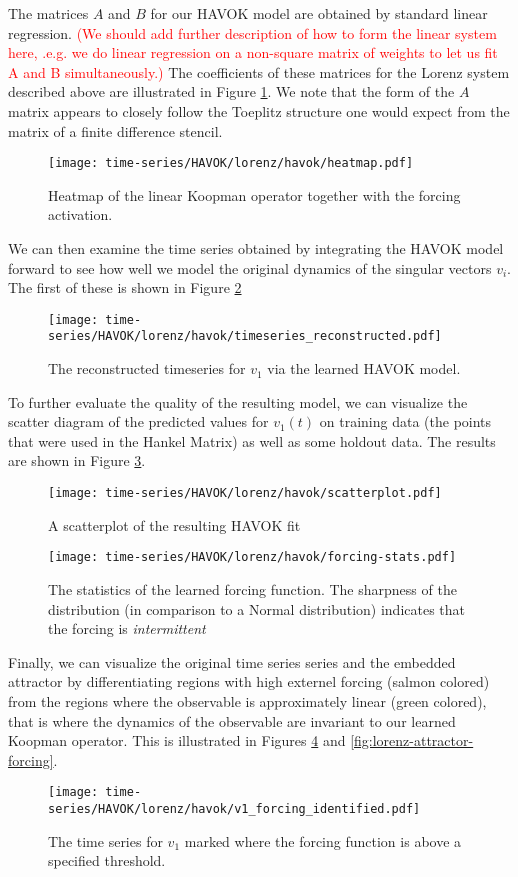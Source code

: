 The matrices $A$ and $B$ for our HAVOK model are obtained by standard linear regression. \textcolor{red}{(We should add further description of how to form the linear system here, .e.g. we do linear regression on a non-square matrix of weights to let us fit A and B simultaneously.)} The coefficients of these matrices for the Lorenz system described above are illustrated in Figure \ref{fig:lorenz-coeffs}. We note that the form of the $A$ matrix appears to closely follow the Toeplitz structure one would expect from the matrix of a finite difference stencil.
\begin{figure}[h!]
  \centering
  \texttt{[image: time-series/HAVOK/lorenz/havok/heatmap.pdf]}
  \caption{Heatmap of the linear Koopman operator together with the forcing activation.}
  \label{fig:lorenz-coeffs}
\end{figure}
We can then examine the time series obtained by integrating the HAVOK model forward to see how well we model the original dynamics of the singular vectors $v_i$. The first of these is shown in Figure \ref{fig:lorenz-v1}
\begin{figure}[h!]
  \centering
  \texttt{[image: time-series/HAVOK/lorenz/havok/timeseries\_reconstructed.pdf]}
  \caption{The reconstructed timeseries for $v_1$ via the learned HAVOK model.}
  \label{fig:lorenz-v1}
\end{figure}
To further evaluate the quality of the resulting model, we can visualize the scatter diagram of the predicted values for $v_1(t)$ on training data (the points that were used in the Hankel Matrix) as well as some holdout data. The results are shown in Figure \ref{fig:lorenz-scatter}.
\begin{figure}[h!]
  \centering
  \texttt{[image: time-series/HAVOK/lorenz/havok/scatterplot.pdf]}
  \caption{A scatterplot of the resulting HAVOK fit}
  \label{fig:lorenz-scatter}
\end{figure}

\begin{figure}[!hbt]
  \centering
  \texttt{[image: time-series/HAVOK/lorenz/havok/forcing-stats.pdf]}
  \caption{The statistics of the learned forcing function. The sharpness of the distribution (in comparison to a Normal distribution) indicates that the forcing is \textit{intermittent}}
\end{figure}


Finally, we can visualize the original time series series and the embedded attractor by differentiating regions with high externel forcing (salmon colored) from the regions where the observable is approximately linear (green colored), that is where the dynamics of the observable are invariant to our learned Koopman operator. This is illustrated in Figures \ref{fig:lorenz-forcing} and \ref{fig:lorenz-attractor-forcing}.
\begin{figure}[!hbt]
  \centering
  \texttt{[image: time-series/HAVOK/lorenz/havok/v1\_forcing\_identified.pdf]}
  \caption{The time series for $v_1$ marked where the forcing function is above a specified threshold.}
  \label{fig:lorenz-forcing}
\end{figure}


